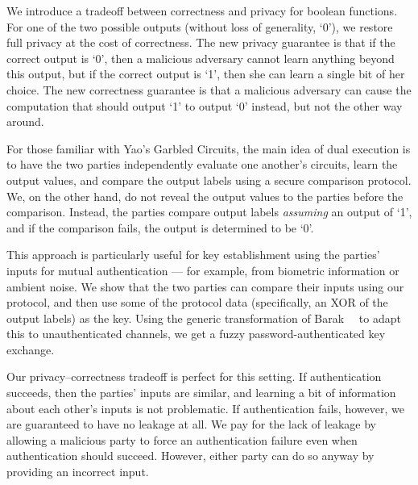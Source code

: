 \documentclass[envcountsame,runningheads]{llncs}
\begin{document}
We introduce a tradeoff between correctness and privacy for boolean functions. 
For one of the two possible outputs (without loss of generality, `0'), we restore full privacy at the cost of correctness.
The new privacy guarantee is that if the correct output is `0', then  a malicious adversary cannot learn anything beyond this output, but if the correct output is `1', then she can learn a single bit of her choice. 
The new correctness guarantee is that a malicious adversary can cause the computation  that should output `1' to output `0' instead, but not the other way around.

For those familiar with Yao's Garbled Circuits, the main idea of dual execution is to have the two parties independently evaluate one another's circuits, learn the output values, and compare the output labels using a secure comparison protocol.
We, on the other hand, do not reveal the output values to the parties before the comparison.
Instead, the parties compare output labels \emph{assuming} an output of `1', and if the comparison fails, the output is determined to be `0'. 

This approach is particularly useful for key establishment using the parties' inputs for mutual authentication --- for example, from biometric information or ambient noise.
We show that the two parties can compare their inputs using our protocol, and then use some of the protocol data (specifically, an XOR of the output labels) as the key.
Using the generic transformation of Barak~\etal~\cite{C:BCLPR05} to adapt this to unauthenticated channels, we get a fuzzy password-authenticated key exchange.

Our privacy--correctness tradeoff is perfect for this setting.
If authentication succeeds, then the parties' inputs are similar, and learning a bit of information about each other's inputs is not problematic.
If authentication fails, however, we are guaranteed to have no leakage at all. 
We pay for the lack of leakage by allowing a malicious party to force an authentication failure even when authentication should succeed.
However, either party can do so anyway by providing an incorrect input.



\end{document}

